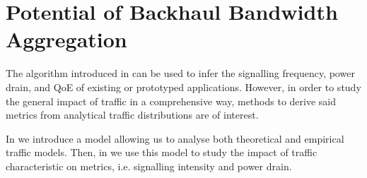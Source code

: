 \section{Potential of Backhaul Bandwidth Aggregation}\label{sec:aggregation:performance_model}
The algorithm introduced in  can be used to infer the signalling frequency, power drain, and \gls{QoE} of existing or prototyped applications.
However, in order to study the general impact of traffic in a comprehensive way, methods to derive said metrics from analytical traffic distributions are of interest.

In  we introduce a model allowing us to
analyse both theoretical and empirical traffic models.
Then, in  we use this model to study the impact of traffic characteristic on metrics, i.e. signalling intensity and power drain.



